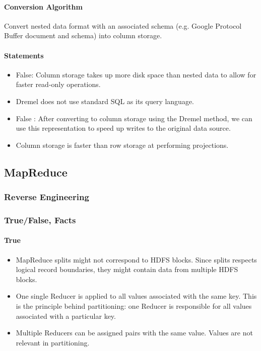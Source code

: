 \paragraph{Conversion Algorithm}
Convert nested data format with an associated schema (e.g. Google Protocol Buffer document and schema) into column storage.




\paragraph{Statements}
\begin{itemize}
    \item False: Column storage takes up more disk space than nested data to allow for faster read-only operations. %
    \item Dremel does not use standard SQL as its query language.
    \item False : After converting to column storage using the Dremel method, we can use this representation to speed up writes to the original data source. %
    \item Column storage is faster than row storage at performing projections.
\end{itemize}






\subsection{MapReduce}





\subsubsection{Reverse Engineering}

\subsubsection{True/False, Facts}

\paragraph{True}
\begin{itemize}
    \item MapReduce splits might not correspond to HDFS blocks. Since splits respects logical record boundaries, they might contain data from multiple HDFS blocks.
    \item One single Reducer is applied to all values associated with the same key. This is the principle behind partitioning: one Reducer is responsible for all values associated with a particular key.
    \item Multiple Reducers can be assigned pairs with the same value. Values are not relevant in partitioning.
\end{itemize}

